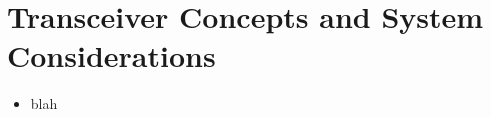 \section{Transceiver Concepts and System Considerations}
\begin{itemize}
    \itemsep0pt
    \item blah
\end{itemize}
